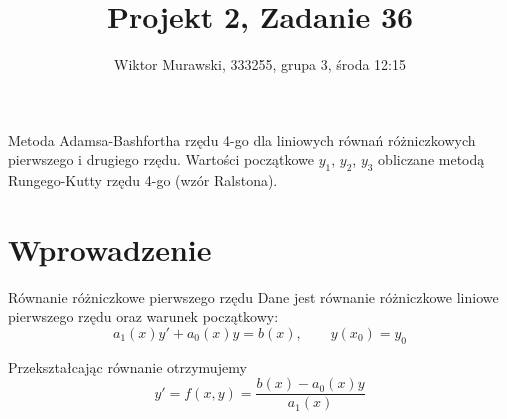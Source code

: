 \documentclass[9pt]{beamer}
\title{Projekt 2, Zadanie 36}
\author{Wiktor Murawski, 333255, grupa 3, środa 12:15}
\date{}
\begin{document}
\begin{frame}
    \begin{spacing}{1.75}
    \begin{center}
        \inserttitle\par
        \insertauthor
    \end{center}
    \vspace{2em}
    Metoda Adamsa-Bashfortha rzędu 4-go dla liniowych równań różniczkowych pierwszego i drugiego rzędu. Wartości początkowe $y_1$, $y_2$, $y_3$ obliczane metodą Rungego-Kutty rzędu 4-go (wzór Ralstona). 
    \end{spacing}
\end{frame}

\section{Wprowadzenie}
\begin{frame}{Równanie różniczkowe pierwszego rzędu}
    Dane jest równanie różniczkowe liniowe pierwszego rzędu oraz warunek początkowy:
    \begin{equation*}
        \label{eq1}
        a_1(x)y' + a_0(x)y = b(x), \qquad y(x_0) = y_0
    \end{equation*}

    \hspace{2cm}
    
    Przekształcając równanie otrzymujemy
    \begin{equation*}
        y' = f(x,y) = \frac{b(x) - a_0(x)y}{a_1(x)}
    \end{equation*}
    
\end{frame}
\end{document}
